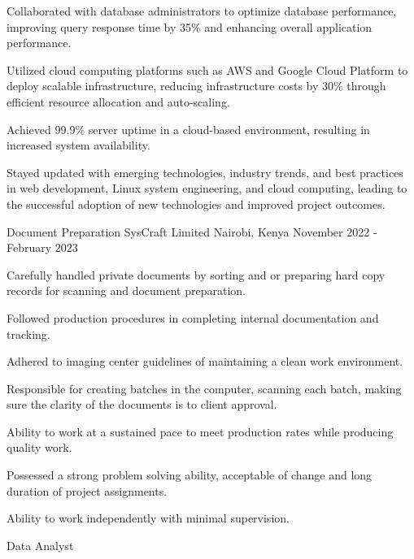 \begin{cventries}
{\begin{cvitems}
        \item {Collaborated with database administrators to optimize database performance, improving query response time by 35\% and enhancing overall application performance.}
        \item {Utilized cloud computing platforms such as AWS and Google Cloud Platform to deploy scalable infrastructure, reducing infrastructure costs by 30\% through efficient resource allocation and auto-scaling.}
        \item {Achieved 99.9\% server uptime in a cloud-based environment, resulting in increased system availability.}
        \item {Stayed updated with emerging technologies, industry trends, and best practices in web development, Linux system engineering, and cloud computing, leading to the successful adoption of new technologies and improved project outcomes.}
      \end{cvitems}
    }
\cventry
    {Document Preparation} %
    {SysCraft Limited} %
    {Nairobi, Kenya} %
    {November 2022 - February 2023} %
    {
      \begin{cvitems} %
        \item {Carefully handled private documents by sorting and or preparing hard copy records for scanning and document preparation.}
        \item {Followed production procedures in completing internal documentation and tracking.}
        \item {Adhered to imaging center guidelines of maintaining a clean work environment.}
        \item {Responsible for creating batches in the computer, scanning each batch, making sure the clarity of the documents is to client approval.}
        \item {Ability to work at a sustained pace to meet production rates while producing quality work.}
        \item {Possessed a strong problem solving ability, acceptable of change and long duration of project assignments.}
        \item {Ability to work independently with minimal supervision.}
      \end{cvitems}
    }
  \cventry
    {Data Analyst} %

\end{cventries}
